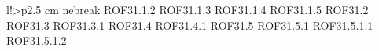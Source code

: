 \begin{tabella}{l!{\VRule}>{\centering\arraybackslash}p{2.5 cm}}
nebreak ROF31.1.2 \linebreak ROF31.1.3 \linebreak ROF31.1.4 \linebreak ROF31.1.5 \linebreak ROF31.2 \linebreak ROF31.3 \linebreak ROF31.3.1 \linebreak ROF31.4 \linebreak ROF31.4.1 \linebreak ROF31.5 \linebreak ROF31.5.1 \linebreak ROF31.5.1.1 \linebreak ROF31.5.1.2 \line
\end{tabella}
